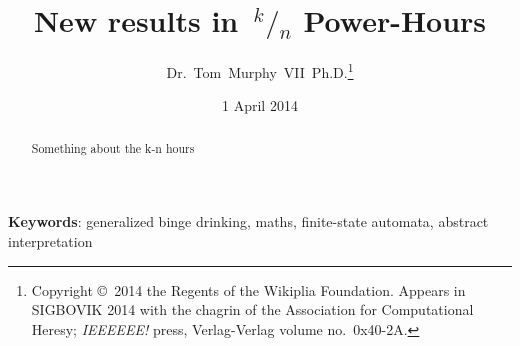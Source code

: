 \documentclass[twocolumn]{article}
\newcommand\sfrac[2]{\!{}\,^{#1}\!/{}\!_{#2}}
\begin{document}
 

\title{New results in $\sfrac{k}{n}$ Power-Hours}
\author{Dr.~Tom~Murphy~VII~Ph.D.\thanks{
Copyright \copyright\ 2014 the Regents of the Wikiplia
Foundation. Appears in SIGBOVIK 2014 with the chagrin of the
Association for Computational Heresy; {\em IEEEEEE!} press,
Verlag-Verlag volume no.~0x40-2A.
}
}

\renewcommand\th{\ensuremath{{}^{\textrm{th}}}}
\newcommand\st{\ensuremath{{}^{\textrm{st}}}}
\newcommand\rd{\ensuremath{{}^{\textrm{rd}}}}
\newcommand\nd{\ensuremath{{}^{\textrm{nd}}}}
\newcommand\at{\ensuremath{\scriptstyle @}}

\renewcommand\>{$>$}
\newcommand\<{$<$}
\newcommand\kn{\ensuremath{\sfrac{k}{n}\,}}
\newcommand\bmsl{BM$s$L}

\newcommand\any{\ensuremath{\textrm{?}}}
\newcommand\nocup{\text{\sout{\ensuremath{\cup}}}}
\newcommand\fullcup{\ensuremath{\uplus}}
\newcommand\emptycup{\ensuremath{\cup}}
\newcommand\overcup{\ensuremath{\cap}}
\newcommand\scup[1]{\ensuremath{\cup\!\!\!{}^{{}_{#1}}}}

\newcommand\nodrink{\ensuremath{\Rightarrow}}
\newcommand\drink{\ensuremath{\stackrel{{}^{\textrm{+}}}{\Rightarrow}}}
\newcommand\qdrink{\ensuremath{\stackrel{{}^{\textrm{?}}}{\Rightarrow}}}

\date{1 April 2014}

\maketitle

\begin{abstract}
Something about the k-n hours

\end{abstract}

\vspace{1em}
{\noindent \small {\bf Keywords}:
  generalized binge drinking, maths,
  finite-state automata,
  abstract interpretation
}
\end{document}
